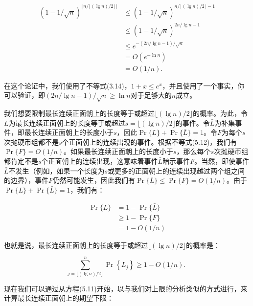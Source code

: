 \documentclass[lang=cn,newtx,10pt,scheme=chinese]{elegantbook}
\begin{document}
$$
\begin{aligned}
(1-1 / \sqrt{n})^{\lfloor n /\lfloor(\lg n) / 2\rfloor\rfloor} & \leq(1-1 / \sqrt{n})^{n /\lfloor(\lg n) / 2\rfloor-1} \\
& \leq(1-1 / \sqrt{n})^{2 n / \lg n-1} \\
& \leq e^{-(2 n / \lg n-1) / \sqrt{n}} \\
& =O\left(e^{-\ln n}\right) \\
& =O(1 / n) .
\end{aligned}
$$

在这个论证中，我们使用了不等式(3.14)，$1+x \leq e^x$，并且使用了一个事实，你可以验证，即$(2n/\lg n-1)/\sqrt{n}\geq \ln n$对于足够大的$n$成立。

我们想要限制最长连续正面朝上的长度等于或超过$\lfloor(\lg n) / 2\rfloor$的概率。为此，令$L$为最长连续正面朝上的长度等于或超过$s=\lfloor(\lg n) / 2\rfloor$的事件。令$\bar{L}$为补集事件，即最长连续正面朝上的长度小于$s$，因此$\operatorname{Pr}\{L\}+\operatorname{Pr}\{\bar{L}\}=1$。令$F$为每个$s$次抛硬币组都不是$s$个正面朝上的连续出现的事件。根据不等式(5.12)，我们有$\operatorname{Pr}\{F\}=O(1/n)$。如果最长连续正面朝上的长度小于$s$，那么每个$s$次抛硬币组都肯定不是$s$个正面朝上的连续出现，这意味着事件$\bar{L}$暗示事件$F$。当然，即使事件$\bar{L}$不发生（例如，如果一个长度为$s$或更多的正面朝上的连续出现越过两个组之间的边界），事件$F$仍然可能发生，因此我们有$\operatorname{Pr}\{\bar{L}\}\leq \operatorname{Pr}\{F\}=O(1/n)$。由于$\operatorname{Pr}\{L\}+\operatorname{Pr}\{\bar{L}\}=1$，我们有：

$$
\begin{aligned}
\operatorname{Pr}\{L\} & =1-\operatorname{Pr}\{\bar{L}\} \\
& \geq 1-\operatorname{Pr}\{F\} \\
& =1-O(1 / n)
\end{aligned}
$$

也就是说，最长连续正面朝上的长度等于或超过$\lfloor(\lg n) / 2\rfloor$的概率是：

$$
\sum_{j=\lfloor(\lg n) / 2\rfloor}^n \operatorname{Pr}\left\{L_j\right\} \geq 1-O(1 / n) \text {. }
$$

现在我们可以通过从方程(5.11)开始，以与我们对上限的分析类似的方式进行，来计算最长连续正面朝上的期望下限：
\end{document}
